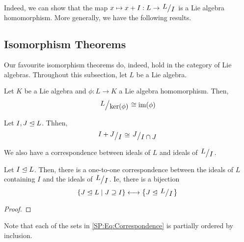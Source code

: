 Indeed, we can show that the map $x \mapsto x + I : L \to \quotient{L}{I}$ is a Lie algebra homomorphism. More generally, we have the following results. %

\subsection{Isomorphism Theorems}

Our favourite isomorphism theorems do, indeed, hold in the category of Lie algebras. Throughout this subsection, let $L$ be a Lie algebra.

\begin{boxtheorem}\label{SP:Thm:FirstIso}
    Let $K$ be a Lie algebra and $\phi : L \to K$ a Lie algebra homomorphism. Then,
    \begin{align}
        \quotient{L}{\pker{\phi}} \cong \pim{\phi}
        \label{SP:Eq:FirstIsomorphism}
    \end{align}
\end{boxtheorem}

\begin{boxtheorem}\label{SP:Thm:SecondIso}
    Let $I, J \trianglelefteq L$. Thhen,
    \begin{align}
        \quotient{I + J}{I} \cong \quotient{J}{I \cap J}
        \label{SP:Eq:SecondIsomorphism}
    \end{align}
\end{boxtheorem}


We also have a correspondence between ideals of $L$ and ideals of $\quotient{L}{I}$.

\begin{boxtheorem}\label{SP:Thm:Correspondence}
    Let $I \trianglelefteq L$. Then, there is a one-to-one correspondence between the ideals of $L$ containing $I$ and the ideals of $\quotient{L}{I}$. Ie, there is a bijection
    \begin{align}
        \setst{J \nsg L}{J \supseteq I}
        \longleftrightarrow
        \set{J \nsg \quotient{L}{I}}
    \end{align}
    \label{SP:Eq:Correspondence}
\end{boxtheorem}
\begin{proof}
    
\end{proof}

Note that each of the sets in \eqref{SP:Eq:Correspondence} is partially ordered by inclusion.

